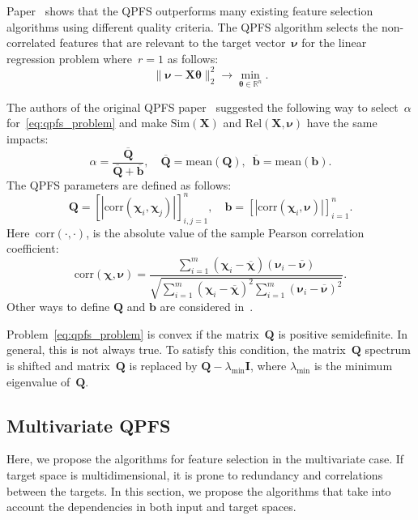 \documentclass[preprint,authoryear,12pt]{elsarticle}
\theoremstyle{definition}
\newcommand{\bb}{\mathbf{b}}
\newcommand{\bX}{\mathbf{X}}
\newcommand{\bQ}{\mathbf{Q}}
\newcommand{\bbR}{\mathbb{R}}
\newcommand{\bchi}{\boldsymbol{\chi}}
\newcommand{\bnu}{\boldsymbol{\nu}}
\newcommand{\btheta}{\boldsymbol{\theta}}
\begin{document}
Paper~\citep{katrutsa2017comprehensive} shows that the QPFS outperforms many existing feature selection algorithms using different quality criteria.
The QPFS algorithm selects the non-correlated features that are relevant to the target vector~$\bnu$ for the linear regression problem where~$r=1$ as follows:
\begin{equation*}
\| \bnu - \bX \btheta\|_2^2 \rightarrow\min_{\btheta \in \bbR^{n}}.
\end{equation*}

The authors of the original QPFS paper~\citep{rodriguez2010quadratic} suggested the following way to select~$\alpha$ for~\eqref{eq:qpfs_problem} and make $\text{Sim}(\bX)$ and $\text{Rel}(\bX, \bnu)$ have the same impacts:
\begin{equation*}
\alpha = \frac{\overline{\bQ}}{\overline{\bQ} + \overline{\bb}}, \quad \overline{\bQ} = \text{mean} (\bQ), \,\,\, \overline{\bb}= \text{mean} (\bb).
\end{equation*}
The QPFS parameters are defined as follows:
\begin{equation}
\bQ = \left[|\text{corr}(\bchi_i, \bchi_j)|\right]_{i,j=1}^n, \quad \bb = \left[|\text{corr}(\bchi_i, \bnu)|\right]_{i=1}^n.
\label{eq:qpfs_1d_qb}
\end{equation}
Here~$\text{corr}(\cdot, \cdot)$, is the absolute value of the sample Pearson correlation coefficient:
\begin{equation*}
\text{corr}(\bchi, \bnu) = \frac{\sum_{i=1}^m(\bchi_i - \overline{\bchi})( \bnu_i - \overline{\bnu})}{\sqrt{\sum_{i=1}^m(\bchi_i - \overline{\bchi})^2\sum_{i=1}^m(\bnu_i - \overline{\bnu})^2}}.
\end{equation*}
Other ways to define $\bQ$ and $\bb$ are considered in~\citep{katrutsa2017comprehensive}.

Problem~\eqref{eq:qpfs_problem} is convex if the matrix~$\bQ$ is positive semidefinite. In general, this is not always true.
To satisfy this condition, the matrix~$\bQ$ spectrum is shifted and matrix~$\bQ$ is replaced by $\bQ - \lambda_{\text{min}} \mathbf{I}$, where $\lambda_{\text{min}} $ is the minimum eigenvalue of~$\bQ$.

\subsection{Multivariate QPFS}

Here, we propose the algorithms for feature selection in the multivariate case. 
If target space is multidimensional, it is prone to redundancy and correlations between the targets. 
In this section, we propose the algorithms that take into account the dependencies in both input and target spaces.
\end{document}
